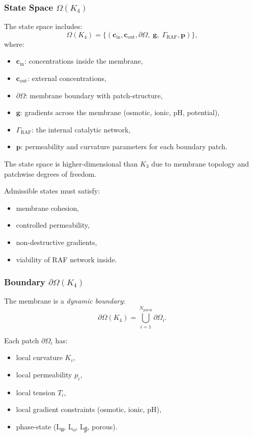 \subsubsection{State Space \texorpdfstring{$\Omega(K_4)$}{\Omega(K_4)}}

The state space includes:
\[
\Omega(K_4) =
\{(\mathbf{c}_{\mathrm{in}},\mathbf{c}_{\mathrm{out}},
  \partial\Omega,\; \mathbf{g},\; \Gamma_{\mathrm{RAF}},
  \mathbf{p})\},
\]
where:
\begin{itemize}
    \item $\mathbf{c}_{\mathrm{in}}$: concentrations inside the membrane,
    \item $\mathbf{c}_{\mathrm{out}}$: external concentrations,
    \item $\partial\Omega$: membrane boundary with patch-structure,
    \item $\mathbf{g}$: gradients across the membrane (osmotic, ionic,
          pH, potential),
    \item $\Gamma_{\mathrm{RAF}}$: the internal catalytic network,
    \item $\mathbf{p}$: permeability and curvature parameters for each
          boundary patch.
\end{itemize}

The state space is higher-dimensional than $K_3$ due to membrane topology
and patchwise degrees of freedom.

Admissible states must satisfy:
\begin{itemize}
    \item membrane cohesion,
    \item controlled permeability,
    \item non-destructive gradients,
    \item viability of RAF network inside.
\end{itemize}

\subsubsection{Boundary \texorpdfstring{$\partial\Omega(K_4)$}{\partial\Omega(K_4)}}

The membrane is a \emph{dynamic boundary}:
\[
\partial\Omega(K_4) = \bigcup_{i=1}^{N_{\mathrm{patch}}}
    \partial\Omega_i.
\]

Each patch $\partial\Omega_i$ has:
\begin{itemize}
    \item local curvature $K_i$,
    \item local permeability $p_i$,
    \item local tension $T_i$,
    \item local gradient constraints (osmotic, ionic, pH),
    \item phase-state (L\textsubscript{α}, L\textsubscript{o},
          L\textsubscript{β}, porous).
\end{itemize}

